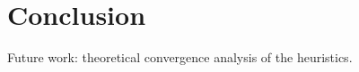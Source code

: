 
\chapter{Conclusion}
\label{cha:conclusion}

Future work: theoretical convergence analysis of the heuristics.

